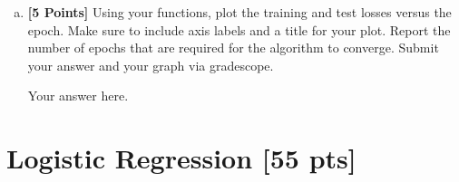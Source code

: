 \documentclass[a4paper]{article}
\theoremstyle{definition}
\newcommand \code [1]{{\tt #1}}
\newenvironment{soln}{
    \leavevmode\color{red}\ignorespaces
}{}
\begin{document}
\begin{enumerate}[(a)]




\item {\bf [5 Points]}  Using your functions, plot the training and test losses versus the epoch. Make sure to include axis labels and a title for your plot. Report the number of epochs that are required for the algorithm to converge. Submit your answer and your graph via gradescope.

\begin{soln}
Your answer here.
\end{soln}
  
\end{enumerate}



\section{Logistic Regression [55 pts]}
\end{document}
